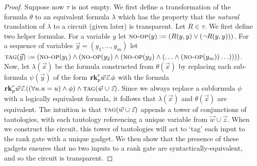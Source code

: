 \documentclass[../paper.tex]{subfiles}
\begin{document}
\begin{proof}
  
  Suppose now $\tau$ is not empty. We first define a transformation of the
  formula $\theta$ to an equivalent formula $\lambda$ which has the property
  that the \emph{natural} translation of $\lambda$ to a circuit (given later) is
  transparent. Let $R \in \tau$. We first define two helper formulas. For a
  variable $y$ let ${\normalfont\textsc{no-op}}(y) := (R(y, y) \lor (\neg R(y, y)))$. For a
  sequence of variables $\vec{y} = (y_1, \ldots, y_m)$ let ${\normalfont\textsc{tag}} (\vec{y})
  := ({\normalfont\textsc{no-op}}(y_1) \land ({\normalfont\textsc{no-op}}(y_2) \land ( {\normalfont\textsc{no-op}}(y_2) \land (
  \ldots \land ({\normalfont\textsc{no-op}}(y_m)) \ldots))))$. Now, let $\lambda (\vec{x})$ be
  the formula constructed from $\theta(\vec{x})$ by replacing each sub-formula
  $\psi(\vec{y})$ of the form $\text{\textbf{rk}}^r_p \vec{w} \vec{z} . \phi$ with the
  formula $\text{\textbf{rk}}^r_p \vec{w}\vec{z} . ((\forall u . u = u) \land \phi) \land
  {\normalfont\textsc{tag}}(\vec{w} \cup \vec{z})$. Since we always replace a subformula $\phi$
  with a logically equivalent formula, it follows that $\lambda (\vec{x})$ and
  $\theta (\vec{x})$ are equivalent. The intuition is that ${\normalfont\textsc{tag}}(\vec{w}
  \cup \vec{z})$ appends a tower of conjunctions of tautologies, with each
  tautology referencing a unique variable from $\vec{w} \cup \vec{z}$. When we
  construct the circuit, this tower of tautologies will act to `tag' each input
  to the rank gate with a unique gadget. We then show that the presence of these
  gadgets ensures that no two inputs to a rank gate are
  syntactically-equivalent, and so the circuit is transparent.
  




\end{proof}
\end{document}

